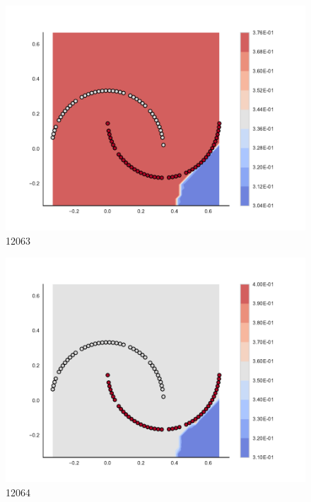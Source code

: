 \begin{subfigure}[b]{0.09\textwidth}
    \includegraphics[clip, trim=2.35cm 1.75cm 4.5cm 0cm,width=\textwidth]{img/convergence/12063.pdf}
    \caption{12063}
    \label{fig:convergence_12063}
\end{subfigure}
%
\begin{subfigure}[b]{0.09\textwidth}
    \includegraphics[clip, trim=2.35cm 1.75cm 4.5cm 0cm,width=\textwidth]{img/convergence/12064.pdf}
    \caption{12064}
    \label{fig:convergence_12064}
\end{subfigure}
%
